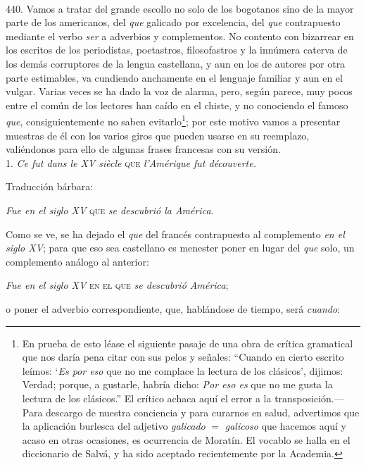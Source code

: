 \documentclass{article}
\begin{document}
\paragraph{} 440. Vamos a tratar del grande escollo no solo de los bogotanos sino de la mayor 
parte de los americanos, del \emph{que} galicado por excelencia, del \emph{que} contrapuesto mediante el 
verbo \emph{ser} a adverbios y complementos. No contento con bizarrear en los escritos de los periodistas, 
poetastros, filosofastros y la innúmera caterva de los demás corruptores de la lengua 
castellana, y aun en los de autores por otra parte estimables, va cundiendo anchamente en el 
lenguaje familiar y aun en el vulgar. Varias veces se ha dado la voz de alarma, pero, según 
parece, muy pocos entre el común de los lectores han caído en el chiste, y no conociendo el famoso 
\emph{que}, consiguientemente no saben evitarlo\footnote{En prueba de esto léase el siguiente pasaje de
una obra de crítica gramatical que nos daría pena citar con sus pelos y señales: ``Cuando en cierto
escrito leímos: `\emph{Es por eso} que no me complace la lectura de los clásicos', dijimos: Verdad; 
porque, a gustarle, habría dicho: \emph{Por eso es} que no me gusta la lectura de los clásicos.'' El 
crítico achaca aquí el error a la transposición.---Para descargo de nuestra conciencia y para curarnos en 
salud, advertimos que la aplicación burlesca del adjetivo \emph{galicado} $=$ \emph{galicoso} que hacemos 
aquí y acaso en otras ocasiones, es ocurrencia de Moratín. El vocablo se halla en el diccionario de 
Salvá, y ha sido aceptado recientemente por la Academia.}; por este motivo vamos a presentar muestras de 
él 
con los varios giros que pueden usarse en su reemplazo, valiéndonos para ello de algunas frases 
francesas con su versión.
\\

1. \emph{Ce fut dans le XV siècle} \textsc{que} \emph{l'Amérique fut découverte.}

Traducci\'on bárbara:

\emph{Fue en el siglo XV} \textsc{que} \emph{se descubrió la América}.

Como se ve, se ha dejado el \emph{que} del francés contrapuesto al complemento \emph{en el siglo XV}; para que 
eso sea castellano es menester poner en lugar del \emph{que} solo, un complemento análogo al 
anterior:

\emph{Fue en el siglo XV} \textsc{en el que} \emph{se descubrió América};

o poner el adverbio correspondiente, que, hablándose de tiempo, será \emph{cuando}:
\end{document}
